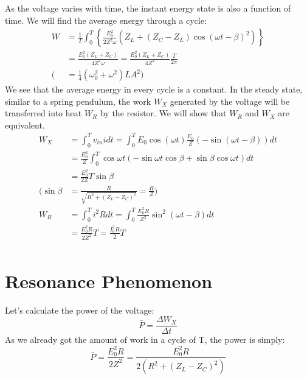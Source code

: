 As the voltage varies with time, the instant energy state is also a function of time. We will find the average energy through a cycle:
\begin{align*}
    W &= \frac{1}{T}\int_0^{T}\left\{\frac{E_0^2}{2Z^2 \omega} (Z_L + (Z_C - Z_L)\cos(\omega t -\beta)^2)\right\} \\
    &= \frac{E_0^2(Z_L+Z_C)}{4Z^2\omega} = \frac{E_0^2(Z_L+Z_C)}{4Z^2} \frac{T}{2\pi}\\
    (&= \frac{1}{4}\left(\omega_{0}^{2}+\omega^{2}\right) L A^{2})
\end{align*}
We see that the average energy in every cycle is a constant. In the steady state, similar to a spring pendulum, the work $W_X$ generated by the voltage  will be transferred into heat $W_R$ by the resistor. We will show that $W_R$ and $W_X$ are equivalent. 
\begin{align*}
    W_X &= \int_0^T v_{in} i dt = \int_0^T E_0 \cos(\omega t) \frac{E_0}{Z} (-\sin(\omega t-\beta)) dt\\
    &=  \frac{E_0^2}{Z} \int_0^T\cos\omega t (- \sin\omega t\cos\beta + \sin\beta \cos\omega t) dt \\
    &=  \frac{E_0^2}{2Z} T \sin\beta  \\
    (\sin\beta &= \frac{R}{\sqrt{R^2 + (Z_L-Z_C)^2}} = \frac{R}{Z}) \\
    W_R &= \int^T_0 i^2 R dt= \int^T_0 \frac{E_0^2R}{Z^2}\sin^2(\omega t - \beta) dt\\
    &= \frac{E_0^2 R}{2Z^2} T = \frac{I_0^2R}{2} T\\
\end{align*}

\section{Resonance Phenomenon}

Let's calculate the power of the voltage:
\[
\bar{P}=\frac{\Delta W_{X}}{\Delta t}
\]
As we already got the amount of work in a cycle of T, the power is simply:
\[
\bar{P}=\frac{E_0^2 R}{2Z^2} = \frac{E_0^2 R}{2(R^2 + (Z_L-Z_C)^2)} 
\]

